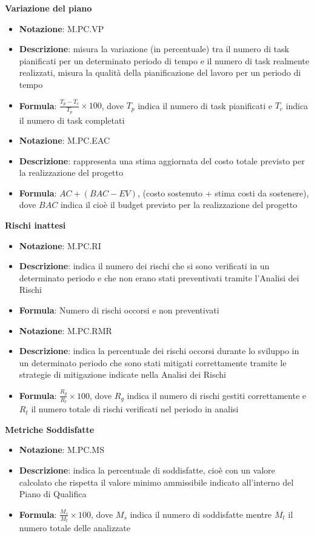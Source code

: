 \textbf{Variazione del piano}
\begin{itemize}
    \item \textbf{Notazione}: M.PC.VP
    \item \textbf{Descrizione}: misura la variazione (in percentuale) tra il numero di task pianificati per un determinato periodo di tempo e il numero di task realmente realizzati, misura la qualità della pianificazione del lavoro per un periodo di tempo
    \item \textbf{Formula}: $\frac{T_p - T_c}{T_p} \times 100$, dove $T_p$ indica il numero di task pianificati e $T_c$ indica il numero di task completati
\end{itemize}
\textbf{}
\begin{itemize}
    \item \textbf{Notazione}: M.PC.EAC
    \item \textbf{Descrizione}: rappresenta una stima aggiornata del costo totale previsto per la realizzazione del progetto
    \item \textbf{Formula}: $AC + (BAC - EV)$, (costo sostenuto + stima costi da sostenere), dove $BAC$ indica il  cioè il budget previsto per la realizzazione del progetto
\end{itemize}
\textbf{Rischi inattesi}
\begin{itemize}
    \item \textbf{Notazione}: M.PC.RI
    \item \textbf{Descrizione}: indica il numero dei rischi che si sono verificati in un determinato periodo e che non erano stati preventivati tramite l'Analisi dei Rischi
    \item \textbf{Formula}: Numero di rischi occorsi e non preventivati
\end{itemize}
\textbf{}
\begin{itemize}
    \item \textbf{Notazione}: M.PC.RMR
    \item \textbf{Descrizione}: indica la percentuale dei rischi occorsi durante lo sviluppo in un determinato periodo che sono stati mitigati correttamente tramite le strategie di mitigazione indicate nella Analisi dei Rischi
    \item \textbf{Formula}: $\frac{R_g}{R_t} \times 100$, dove $R_g$ indica il numero di rischi gestiti correttamente e $R_t$ il numero totale di rischi verificati nel periodo in analisi
\end{itemize}
\textbf{Metriche Soddisfatte}
\begin{itemize}
    \item \textbf{Notazione}: M.PC.MS
    \item \textbf{Descrizione}: indica la percentuale di  soddisfatte, cioè con un valore calcolato che rispetta il valore minimo ammissibile indicato all'interno del Piano di Qualifica
    \item \textbf{Formula}: $\frac{M_s}{M_t} \times 100$, dove $M_s$ indica il numero di  soddisfatte mentre $M_t$ il numero totale delle  analizzate 
\end{itemize}
